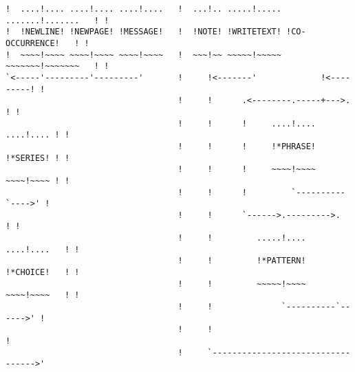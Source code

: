 \begin{verbatim}
!  ....!.... ....!.... ....!....   !  ...!.. .....!..... .......!.......   ! !
!  !NEWLINE! !NEWPAGE! !MESSAGE!   !  !NOTE! !WRITETEXT! !CO-OCCURRENCE!   ! !
!  ~~~~!~~~~ ~~~~!~~~~ ~~~~!~~~~   !  ~~~!~~ ~~~~~!~~~~~ ~~~~~~~!~~~~~~~   ! !
`<-----'---------'---------'       !     !<-------'             !<---------! !
                                   !     !      .<--------.-----+--->.     ! !
                                   !     !      !     ....!....  ....!.... ! !
                                   !     !      !     !*PHRASE!  !*SERIES! ! !
                                   !     !      !     ~~~~!~~~~  ~~~~!~~~~ ! !
                                   !     !      !         `----------`---->' !
                                   !     !      `------>.--------->.       ! !
                                   !     !         .....!....  ....!....   ! !
                                   !     !         !*PATTERN!  !*CHOICE!   ! !
                                   !     !         ~~~~~!~~~~  ~~~~!~~~~   ! !
                                   !     !              `----------`------>' !
                                   !     !                                   !
                                   !     `---------------------------------->'
\end{verbatim}
\newpage
